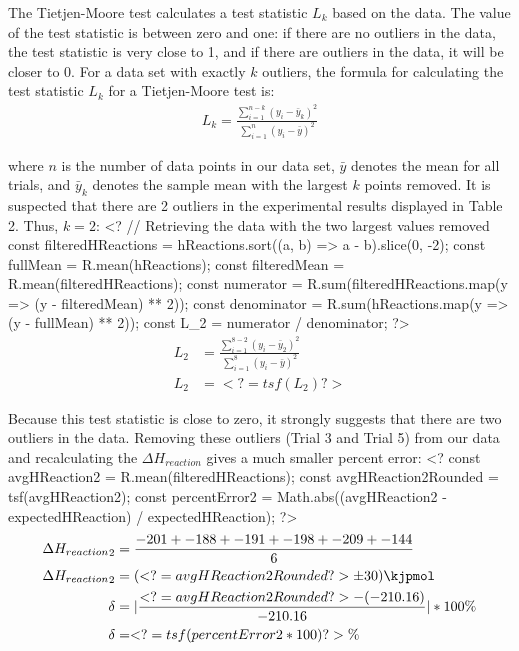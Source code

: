 \documentclass[12pt, notitlepage, letterpaper]{report}
\begin{document}
The Tietjen-Moore test calculates a test statistic $L_k$ based on the data. The value of the test statistic is between zero and one: if there are no outliers in the data, the test statistic is very close to 1, and if there are outliers in the data, it will be closer to 0. For a data set with exactly $k$ outliers, the formula for calculating the test statistic $L_k$ for a Tietjen-Moore test is:
\begin{align*}
	L_k = \frac{\sum_{i=1}^{n-k}(y_i-\bar{y}_k)^2}{\sum_{i=1}^{n}(y_i-\bar{y})^2}
\end{align*}

where $n$ is the number of data points in our data set, $\bar{y}$ denotes the mean for all trials, and $\bar{y}_k$ denotes the sample mean with the largest $k$ points removed. It is suspected that there are 2 outliers in the experimental results displayed in Table 2. Thus, $k = 2$:
%
<?
// Retrieving the data with the two largest values removed
const filteredHReactions = hReactions.sort((a, b) => a - b).slice(0, -2);
const fullMean = R.mean(hReactions);
const filteredMean = R.mean(filteredHReactions);
const numerator = R.sum(filteredHReactions.map(y => (y - filteredMean) ** 2));
const denominator = R.sum(hReactions.map(y => (y - fullMean) ** 2));
const L_2 = numerator / denominator;
?>
%
\begin{align*}
	L_2 & = \frac{\sum_{i=1}^{8-2}(y_i-\bar{y}_2)^2}{\sum_{i=1}^{8}(y_i-\bar{y})^2} \\
	L_2 & = <?= tsf(L_2) ?>
\end{align*}

Because this test statistic is close to zero, it strongly suggests that there are two outliers in the data. Removing these outliers (Trial 3 and Trial 5) from our data and recalculating the $\Delta H_{reaction}$ gives a much smaller percent error:
%
<?
const avgHReaction2 = R.mean(filteredHReactions);
const avgHReaction2Rounded = tsf(avgHReaction2);
const percentError2 = Math.abs((avgHReaction2 - expectedHReaction) / expectedHReaction);
?>
%
\begin{align*}
	\Delta {H_{reaction}}_{2} & = \frac{-201 + -188 + -191 + -198 + -209 + -144}{6}                 \\
	\Delta {H_{reaction}}_{2} & = (<?= avgHReaction2Rounded ?> \pm 30)\kjpmol                       \\
	\delta                    & = |\frac{<?= avgHReaction2Rounded ?> - (-210.16)}{-210.16}| * 100\% \\
	\delta                    & = <?= tsf(percentError2 * 100) ?>\%
\end{align*}
\end{document}
